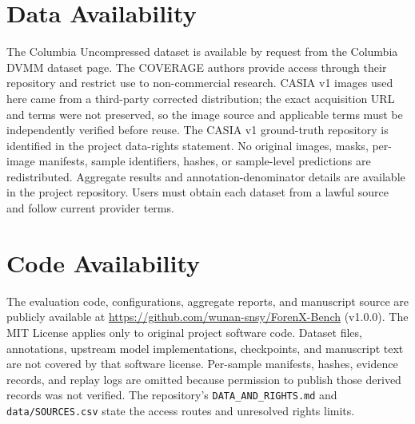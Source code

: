 \section*{Data Availability}
The Columbia Uncompressed dataset is available by request from the Columbia DVMM dataset page. The COVERAGE authors provide access through their repository and restrict use to non-commercial research. CASIA v1 images used here came from a third-party corrected distribution; the exact acquisition URL and terms were not preserved, so the image source and applicable terms must be independently verified before reuse. The CASIA v1 ground-truth repository is identified in the project data-rights statement. No original images, masks, per-image manifests, sample identifiers, hashes, or sample-level predictions are redistributed. Aggregate results and annotation-denominator details are available in the project repository. Users must obtain each dataset from a lawful source and follow current provider terms.

\section*{Code Availability}
The evaluation code, configurations, aggregate reports, and manuscript source are publicly available at \url{https://github.com/wunan-snsy/ForenX-Bench} (v1.0.0). The MIT License applies only to original project software code. Dataset files, annotations, upstream model implementations, checkpoints, and manuscript text are not covered by that software license. Per-sample manifests, hashes, evidence records, and replay logs are omitted because permission to publish those derived records was not verified. The repository's \texttt{DATA\_AND\_RIGHTS.md} and \texttt{data/SOURCES.csv} state the access routes and unresolved rights limits.
